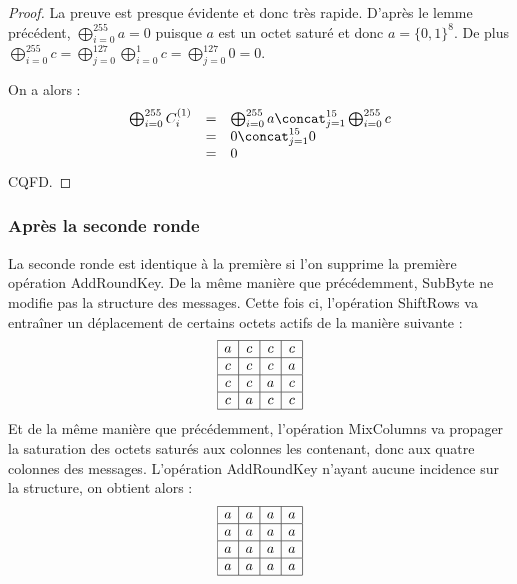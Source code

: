 \documentclass[a4paper,11pt]{article}
\begin{document}
\begin{proof}
    La preuve est presque évidente et donc très rapide. D'après le lemme précédent,
    $\bigoplus_{i=0}^{255} a = 0$ puisque $a$ est un octet saturé et donc $a = \{0,1\}^8$.
    De plus $\bigoplus_{i=0}^{255} c = \bigoplus_{j=0}^{127} \bigoplus_{i=0}^1 c =
    \bigoplus_{j=0}^{127} 0 = 0$.

    On a alors :
    \begin{displaymath}
        \begin{array}{rcl}
            \bigoplus_{i=0}^{255} C_i^{(1)} & = & \bigoplus_{i=0}^{255} a \concat_{j=1}^{15} \bigoplus_{i=0}^{255} c\\
                                            & = & 0 \concat_{j=1}^{15} 0 \\
                                            & = & 0 \\
        \end{array}
    \end{displaymath}
    CQFD.
\end{proof}

\subsubsection*{Après la seconde ronde}

La seconde ronde est identique à la première si l'on supprime la première opération AddRoundKey. De
la même manière que précédemment, SubByte ne modifie pas la structure des messages.
Cette fois ci, l'opération ShiftRows va entraîner un déplacement de certains octets actifs de la
manière suivante :
\begin{displaymath}
    \begin{array}{|c|c|c|c|} \hline
        a & c & c & c \\ \hline
        c & c & c & a \\ \hline
        c & c & a & c \\ \hline
        c & a & c & c \\ \hline
    \end{array}
\end{displaymath}
Et de la même manière que précédemment, l'opération MixColumns va propager la saturation des octets
saturés aux colonnes les contenant, donc aux quatre colonnes des messages. L'opération AddRoundKey
n'ayant aucune incidence sur la structure, on obtient alors :
\begin{displaymath}
    \begin{array}{|c|c|c|c|} \hline
        a & a & a & a \\ \hline
        a & a & a & a \\ \hline
        a & a & a & a \\ \hline
        a & a & a & a \\ \hline
    \end{array}
\end{displaymath}
\end{document}
